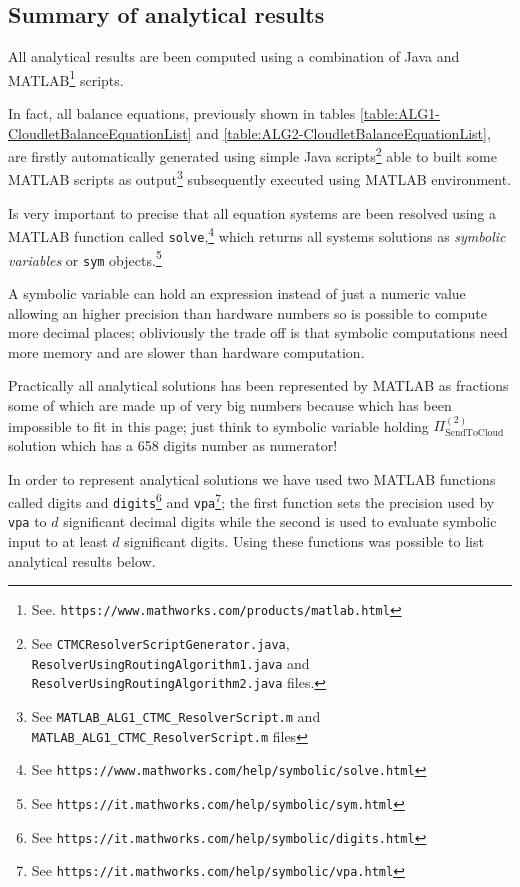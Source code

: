 \documentclass[10pt,a4paper]{article}
\begin{document}
\newpage
\subsection{Summary of analytical results}


All analytical results are been computed using a combination of Java and MATLAB\footnote{See. \texttt{https://www.mathworks.com/products/matlab.html}} scripts.

In fact, all balance equations, previously shown in tables \ref{table:ALG1-CloudletBalanceEquationList} and \ref{table:ALG2-CloudletBalanceEquationList}, are firstly automatically generated using simple Java scripts\footnote{See \texttt{CTMCResolverScriptGenerator.java}, \texttt{ResolverUsingRoutingAlgorithm1.java} and \texttt{ResolverUsingRoutingAlgorithm2.java} files.} able to built some MATLAB scripts as output\footnote{See \texttt{MATLAB\_ALG1\_CTMC\_ResolverScript.m} and \texttt{MATLAB\_ALG1\_CTMC\_ResolverScript.m} files} subsequently executed using MATLAB environment.

Is very important to precise that all equation systems are been resolved using a MATLAB function called \texttt{solve},\footnote{See \texttt{https://www.mathworks.com/help/symbolic/solve.html}} which returns all systems solutions as \textit{symbolic variables} or \texttt{sym} objects.\footnote{See \texttt{https://it.mathworks.com/help/symbolic/sym.html}} 

A symbolic variable can hold an expression instead of just a numeric value allowing an higher precision than hardware numbers so is possible to compute more decimal places; obliviously the trade off is that symbolic computations need more memory and are slower than hardware computation. 

Practically all analytical solutions has been represented by MATLAB as fractions some of which are made up of very big numbers because which has been impossible to fit in this page; just think to symbolic variable holding $\Pi_{\text{SendToCloud}}^{(2)}$ solution which has a 658 digits number as numerator! 

In order to represent analytical solutions we have used two MATLAB functions called digits and \texttt{digits}\footnote{See \texttt{https://it.mathworks.com/help/symbolic/digits.html}} and \texttt{vpa}\footnote{See \texttt{https://it.mathworks.com/help/symbolic/vpa.html}}; the first function sets the precision used by \texttt{vpa} to $d$ significant decimal digits while the second is used to evaluate symbolic input to at least $d$ significant digits. Using these functions was possible to list analytical results below.
\end{document}
